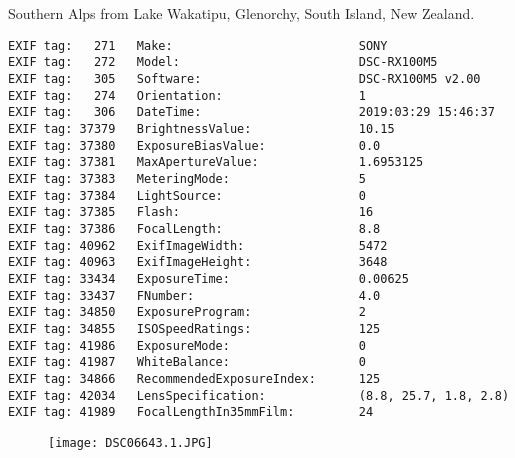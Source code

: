 \section{\protect{}}
\noindent Southern Alps from Lake Wakatipu, Glenorchy, South Island, New Zealand.
\noindent
\begin{lstlisting}
EXIF tag:   271   Make:                          SONY
EXIF tag:   272   Model:                         DSC-RX100M5
EXIF tag:   305   Software:                      DSC-RX100M5 v2.00
EXIF tag:   274   Orientation:                   1
EXIF tag:   306   DateTime:                      2019:03:29 15:46:37
EXIF tag: 37379   BrightnessValue:               10.15
EXIF tag: 37380   ExposureBiasValue:             0.0
EXIF tag: 37381   MaxApertureValue:              1.6953125
EXIF tag: 37383   MeteringMode:                  5
EXIF tag: 37384   LightSource:                   0
EXIF tag: 37385   Flash:                         16
EXIF tag: 37386   FocalLength:                   8.8
EXIF tag: 40962   ExifImageWidth:                5472
EXIF tag: 40963   ExifImageHeight:               3648
EXIF tag: 33434   ExposureTime:                  0.00625
EXIF tag: 33437   FNumber:                       4.0
EXIF tag: 34850   ExposureProgram:               2
EXIF tag: 34855   ISOSpeedRatings:               125
EXIF tag: 41986   ExposureMode:                  0
EXIF tag: 41987   WhiteBalance:                  0
EXIF tag: 34866   RecommendedExposureIndex:      125
EXIF tag: 42034   LensSpecification:             (8.8, 25.7, 1.8, 2.8)
EXIF tag: 41989   FocalLengthIn35mmFilm:         24

\end{lstlisting}
\clearpage
\begin{figure}
\raggedleft
\texttt{[image: DSC06643.1.JPG]}
\end{figure}


\clearpage
